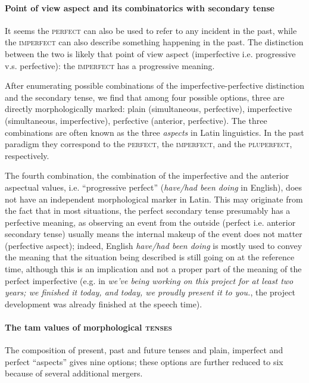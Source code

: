 \documentclass[a4paper, oneside, 12pt]{report}
\newcommand*{\term}[1]{\emph{#1}}
\newcommand{\form}[1]{\emph{#1}}
\newcommand*{\category}[1]{\textsc{#1}}
\begin{document}
\paragraph*{Point of view aspect and its combinatorics with secondary tense}
It seems the \category{perfect} can also be used to refer to any incident in the past,
while the \category{imperfect} can also describe something happening in the past.
The distinction between the two is likely that point of view aspect (imperfective i.e. progressive v.s. perfective):
the \category{imperfect} has a progressive meaning.

After enumerating possible combinations of the imperfective-perfective distinction and the secondary tense, 
we find that among four possible options,
three are directly morphologically marked: 
plain (simultaneous, perfective), 
imperfective (simultaneous, imperfective), 
perfective (anterior, perfective). 
The three combinations are often known as the three \term{aspects} in Latin linguistics.
In the past paradigm they correspond to
the \category{perfect}, the \category{imperfect}, and the \category{pluperfect}, respectively.

The fourth combination, the combination of the imperfective and the anterior aspectual values, 
i.e. ``progressive perfect'' (\form{have/had been doing} in English),
does not have an independent morphological marker in Latin.
This may originate from the fact that in most situations, 
the perfect secondary tense presumably has a perfective meaning,
as observing an event from the outside (perfect i.e. anterior secondary tense)
usually means the internal makeup of the event does not matter (perfective aspect);
indeed, English \form{have/had been doing}
is mostly used to convey the meaning that the situation being described is still going on
at the reference time,
although this is an implication and not a proper part of the meaning of the perfect imperfective
(e.g. in \form{we've being working on this project for at least two years;
we finished it today, and today, we proudly present it to you.},
the project development was already finished at the speech time).

\paragraph*{The \ac{tam} values of morphological \category{tenses}}
\label{sec:verb.paradigm.tam.tense-combination}
The composition of present, past and future tenses
and plain, imperfect and perfect ``aspects''
gives nine options;
these options are further reduced to six because of several additional mergers.
\end{document}
